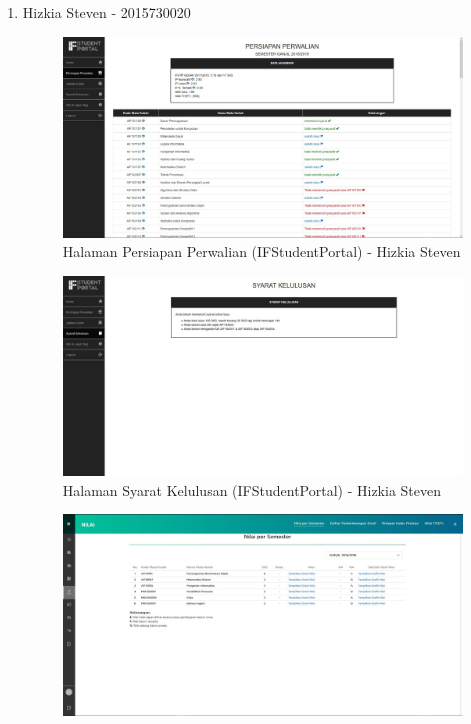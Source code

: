 \begin{itemize}
\begin{enumerate}
		\item Hizkia Steven - 2015730020
		\begin{figure}[H]
			\centering
			\includegraphics[scale=0.325]{Gambar/HasilPengujian/2015_2_persiapan_perwalian_ifstudentportal}
			\caption{Halaman Persiapan Perwalian (IFStudentPortal) - Hizkia Steven}
			\label{fig:2015_2_persiapan_perwalian_ifstudentportal}
		\end{figure}
		\begin{figure}[H]
			\centering
			\includegraphics[scale=0.325]{Gambar/HasilPengujian/2015_2_syarat_kelulusan_ifstudentportal}
			\caption{Halaman Syarat Kelulusan (IFStudentPortal) - Hizkia Steven}
			\label{fig:2015_2_syarat_kelulusan_ifstudentportal}
		\end{figure}
		\begin{figure}[H]
			\centering
			\includegraphics[scale=0.325]{Gambar/HasilPengujian/2015_2_nps_studentportal}

\end{figure}
\end{enumerate}
\end{itemize}

